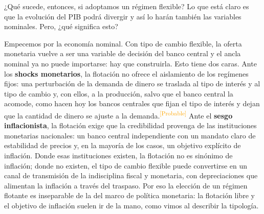 \documentclass[10pt,a4paper]{article}
\begin{document}
¿Qué sucede, entonces, si adoptamos un régimen flexible? Lo que está claro es que la evolución del PIB podrá divergir y así lo harán también las variables nominales. Pero, ¿qué significa esto?

Empecemos por la economía nominal. Con tipo de cambio flexible, la oferta monetaria vuelve a ser una variable de decisión del banco central y el ancla nominal ya no puede importarse: hay que construirla. Esto tiene dos caras. Ante los \textbf{shocks monetarios}, la flotación no ofrece el aislamiento de los regímenes fijos: una perturbación de la demanda de dinero se traslada al tipo de interés y al tipo de cambio y, con ellos, a la producción, salvo que el banco central la acomode, como hacen hoy los bancos centrales que fijan el tipo de interés y dejan que la cantidad de dinero se ajuste a la demanda.\textcolor{orange}{\textsuperscript{[Probable]}} Ante el \textbf{sesgo inflacionista}, la flotación exige que la credibilidad provenga de las instituciones monetarias nacionales: un banco central independiente con un mandato claro de estabilidad de precios y, en la mayoría de los casos, un objetivo explícito de inflación. Donde esas instituciones existen, la flotación no es sinónimo de inflación; donde no existen, el tipo de cambio flexible puede convertirse en un canal de transmisión de la indisciplina fiscal y monetaria, con depreciaciones que alimentan la inflación a través del traspaso. Por eso la elección de un régimen flotante es inseparable de la del marco de política monetaria: la flotación libre y el objetivo de inflación suelen ir de la mano, como vimos al describir la tipología.
\end{document}
